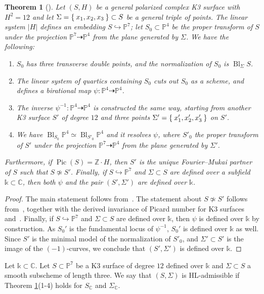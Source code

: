 \documentclass[a4paper,12pt]{amsart}
\def\C{\mathbb C}
\def\k{\mathbb k}
\def\P{\mathbb P}
\def\Z{\mathbb Z}
\def\Pic{{\operatorname{Pic}}}
\def\Bl{{\operatorname{Bl}}}
\theoremstyle{plain}
\newtheorem{theorem}[dummy]{Theorem}
\numberwithin{equation}{section}
\theoremstyle{definition}
\newcommand{\gS}{\Sigma}
\renewcommand{\(}{\left(}
\renewcommand{\)}{\right)}
\newcommand{\dto}{\dashrightarrow}
\newcommand{\hto}{\hookrightarrow}
\begin{document}
\begin{theorem}[{\cite[Theorem 2.1, Theorem 3.1]{HassettLai}}]\label{thm-HL}
Let $(S,H)$ be a general polarized complex K3 surface with $H^2 = 12$
and let $\gS = \Set{ x_1,x_2,x_3 } \subset S$ be a general triple of points.
The linear system $|H|$ defines an embedding $S \hto \P^7$;
let $S_0 \subset \P^4$ be the proper transform
of $S$ under the projection $\P^7 \dto \P^4$
from the plane generated by $\gS$.
We have the following:
\begin{enumerate}
\item $S_0$ has three transverse double points,
and the normalization of $S_0$ is $\Bl_\gS S$.
\item The linear system of quartics containing $S_0$ cuts out
$S_0$ as a scheme, and
defines a birational map
$\psi: \P^4 \dto \P^4$.
\item 
The inverse
$\psi^{-1}: \P^4 \dto \P^4$
is constructed the same way,
starting from another K3 surface $S'$ of degree $12$
and three points $\gS' = \Set{ x_1', x_2', x_3' }$ on $S'$.
\item We have $\Bl_{S_0}\P^4 \simeq \Bl_{S'_0}\P^4$
and it resolves $\psi$,
where $S'_0$ the proper transform
of $S'$ under the projection $\P^7 \dto \P^4$
from the plane generated by $\gS'$.
\end{enumerate}
Furthermore, if $\Pic(S) = \Z \cdot H$, 
then $S'$ is the unique Fourier--Mukai partner of $S$ such that
$S \not\simeq S'$.
Finally, if $S \hto \P^7$ and $\gS \subset S$ are defined over a subfield $\k \subset \C$,
then both $\psi$ and the pair $(S',\gS')$ are defined over $\k$.
\end{theorem}
\begin{proof}
The main statement follows from~\cite[\S1.1, Theorem 2.1]{HassettLai}.
The statement about $S \not\simeq S'$ follows from~\cite[Theorem 3.1]{HassettLai},
together with the derived invariance of Picard number for K3 surfaces 
and~\cite[Proposition 1.10]{OguisoFM}.
Finally, if $S \hto \P^7$ and $\gS \subset S$ are defined over $\k$,
then $\psi$ is defined over $\k$ by construction.
As $S_0'$ is the fundamental locus of $\psi^{-1}$,
$S_0'$ is defined over $\k$ as well.
Since $S'$ is the minimal model of the normalization of $S'_0$,
and $\gS' \subset S'$ is the image of the $(-1)$-curves,
we conclude that $(S',\gS')$ is defined over $\k$.
\end{proof}

Let $\k \subset \C$.
Let $S \subset \P^7$ be a K3 surface
of degree $12$ defined over $\k$ 
and $\Sigma \subset S$
a smooth subscheme of length three.
We say that $(S, \Sigma)$ is HL-admissible
if 
Theorem \ref{thm-HL}(1-4) holds
    for $S_\C$ and $\Sigma_\C$.
\end{document}

